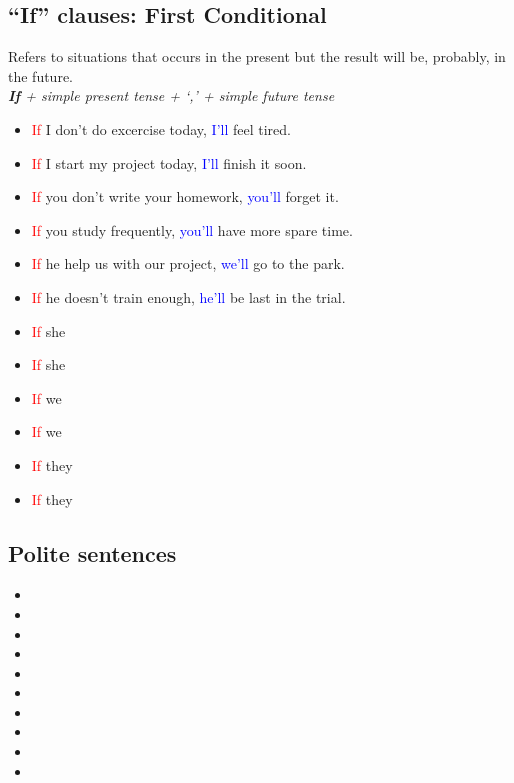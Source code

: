 \subsection{``If'' clauses: First Conditional}
\begin{multicols}{2}
Refers to situations that occurs in the present but the result will be, probably, in the future.\\
\emph{\textbf{If} + simple present tense + `,' + simple future tense}
\begin{itemize}
\item \textcolor{red}{If} I don't do excercise today, \textcolor{blue}{I'll} feel tired.
\item \textcolor{red}{If} I start my project today, \textcolor{blue}{I'll} finish it soon.
\item \textcolor{red}{If} you don't write your homework, \textcolor{blue}{you'll} forget it.
\item \textcolor{red}{If} you study frequently, \textcolor{blue}{you'll} have more spare time.
\item \textcolor{red}{If} he help us with our project, \textcolor{blue}{we'll} go to the park.
\item \textcolor{red}{If} he doesn't train enough, \textcolor{blue}{he'll} be last in the trial.
\item \textcolor{red}{If} she
\item \textcolor{red}{If} she
\item \textcolor{red}{If} we
\item \textcolor{red}{If} we
\item \textcolor{red}{If} they
\item \textcolor{red}{If} they
\end{itemize}
\end{multicols}

\subsection{Polite sentences}
\begin{multicols}{2}
\begin{itemize}
\item 
\item 
\item 
\item 
\item 
\item 
\item 
\item 
\item 
\item 
\end{itemize}
\end{multicols}

